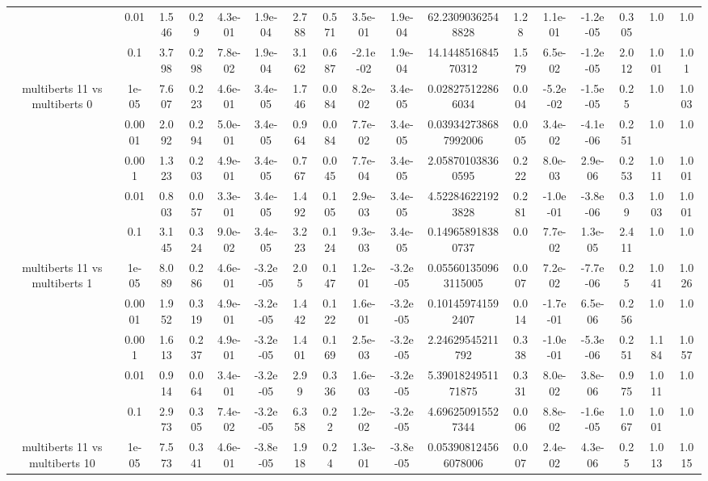 \begin{tabular}{|c|c|c|c|c|c|c|c|c|c|c|c|c|c|c|c|c|}
 & 0.01 & 1.546 & 0.29 & 4.3e-01 & 1.9e-04 & 2.788 & 0.571 & 3.5e-01 & 1.9e-04 & 62.23090362548828 & 1.28 & 1.1e-01 & -1.2e-05 & 0.305 & 1.0 & 1.0 \\
 & 0.1 & 3.798 & 0.298 & 7.8e-02 & 1.9e-04 & 3.162 & 0.687 & -2.1e-02 & 1.9e-04 & 14.144851684570312 & 1.579 & 6.5e-02 & -1.2e-05 & 2.012 & 1.001 & 1.01 \\
\hline
\multirow{5}{*}{multiberts 11 vs multiberts 0} & 1e-05 & 7.607 & 0.223 & 4.6e-01 & 3.4e-05 & 1.746 & 0.084 & 8.2e-02 & 3.4e-05 & 0.028275122866034 & 0.004 & -5.2e-02 & -1.5e-05 & 0.25 & 1.0 & 1.003 \\
 & 0.0001 & 2.092 & 0.294 & 5.0e-01 & 3.4e-05 & 0.964 & 0.084 & 7.7e-02 & 3.4e-05 & 0.039342738687992006 & 0.005 & 3.4e-02 & -4.1e-06 & 0.251 & 1.0 & 1.0 \\
 & 0.001 & 1.323 & 0.203 & 4.9e-01 & 3.4e-05 & 0.767 & 0.045 & 7.7e-04 & 3.4e-05 & 2.058701038360595 & 0.222 & 8.0e-03 & 2.9e-06 & 0.253 & 1.011 & 1.001 \\
 & 0.01 & 0.803 & 0.057 & 3.3e-01 & 3.4e-05 & 1.492 & 0.105 & 2.9e-03 & 3.4e-05 & 4.522846221923828 & 0.281 & -1.0e-01 & -3.8e-06 & 0.39 & 1.003 & 1.001 \\
 & 0.1 & 3.145 & 0.324 & 9.0e-02 & 3.4e-05 & 3.223 & 0.124 & 9.3e-03 & 3.4e-05 & 0.149658918380737 & 0.0 & 7.7e-02 & 1.3e-05 & 2.411 & 1.0 & 1.0 \\
\hline
\multirow{5}{*}{multiberts 11 vs multiberts 1} & 1e-05 & 8.089 & 0.286 & 4.6e-01 & -3.2e-05 & 2.05 & 0.147 & 1.2e-01 & -3.2e-05 & 0.055601350963115005 & 0.007 & 7.2e-02 & -7.7e-06 & 0.25 & 1.041 & 1.026 \\
 & 0.0001 & 1.952 & 0.319 & 4.9e-01 & -3.2e-05 & 1.442 & 0.122 & 1.6e-01 & -3.2e-05 & 0.101459741592407 & 0.014 & -1.7e-01 & 6.5e-06 & 0.256 & 1.0 & 1.0 \\
 & 0.001 & 1.613 & 0.237 & 4.9e-01 & -3.2e-05 & 1.401 & 0.169 & 2.5e-03 & -3.2e-05 & 2.24629545211792 & 0.338 & -1.0e-01 & -5.3e-06 & 0.251 & 1.184 & 1.057 \\
 & 0.01 & 0.914 & 0.064 & 3.4e-01 & -3.2e-05 & 2.99 & 0.336 & 1.6e-03 & -3.2e-05 & 5.3901824951171875 & 0.331 & 8.0e-02 & 3.8e-06 & 0.975 & 1.011 & 1.0 \\
 & 0.1 & 2.973 & 0.305 & 7.4e-02 & -3.2e-05 & 6.358 & 0.22 & 1.2e-02 & -3.2e-05 & 4.696250915527344 & 0.006 & 8.8e-02 & -1.6e-05 & 1.067 & 1.001 & 1.0 \\
\hline
\multirow{5}{*}{multiberts 11 vs multiberts 10} & 1e-05 & 7.573 & 0.341 & 4.6e-01 & -3.8e-05 & 1.918 & 0.24 & 1.3e-01 & -3.8e-05 & 0.053908124566078006 & 0.007 & 2.4e-02 & 4.3e-06 & 0.25 & 1.013 & 1.015 \\

\end{tabular}
